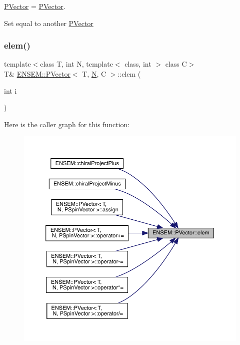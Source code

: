 \mbox{\hyperlink{classENSEM_1_1PVector}{P\+Vector}} = \mbox{\hyperlink{classENSEM_1_1PVector}{P\+Vector}}. 

Set equal to another \mbox{\hyperlink{classENSEM_1_1PVector}{P\+Vector}} \mbox{\label{classENSEM_1_1PVector_a9cd0edde5b031651ca54dcbd424cc7d8}} 
\subsubsection{\texorpdfstring{elem()}{elem()}\hspace{0.1cm}{\footnotesize\ttfamily [1/4]}}
{\footnotesize\ttfamily template$<$class T, int N, template$<$ class, int $>$ class C$>$ \\
T\& \mbox{\hyperlink{classENSEM_1_1PVector}{E\+N\+S\+E\+M\+::\+P\+Vector}}$<$ T, \mbox{\hyperlink{operator__name__util_8cc_a7722c8ecbb62d99aee7ce68b1752f337}{N}}, C $>$\+::elem (\begin{DoxyParamCaption}\item[{int}]{i }\end{DoxyParamCaption})\hspace{0.3cm}{\ttfamily [inline]}}

Here is the caller graph for this function\+:\nopagebreak
\begin{figure}[H]
\begin{center}
\leavevmode
\includegraphics[width=350pt]{da/d9c/classENSEM_1_1PVector_a9cd0edde5b031651ca54dcbd424cc7d8_icgraph}
\end{center}
\end{figure}
\mbox{\label{classENSEM_1_1PVector_a9cd0edde5b031651ca54dcbd424cc7d8}} 
